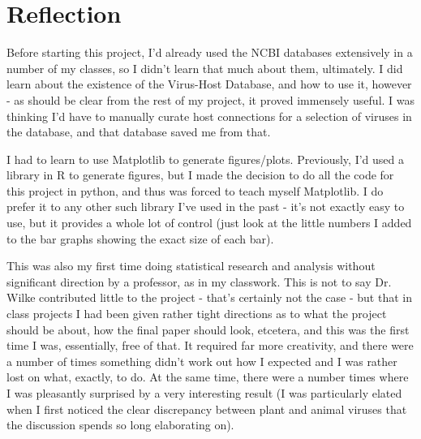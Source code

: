 \documentclass[12pt]{article}
\begin{document}
    \pagebreak

    \section{Reflection}

    Before starting this project, I'd already used the NCBI databases extensively
    in a number of my classes, so I didn't learn that much about them, ultimately.
    I did learn about the existence of the Virus-Host Database, and how to use it,
    however - as should be clear from the rest of my project, it proved immensely
    useful. I was thinking I'd have to manually curate host connections for a
    selection of viruses in the database, and that database saved me from that.

    I had to learn to use Matplotlib to generate figures/plots. Previously, I'd
    used a library in R to generate figures, but I made the decision to do all
    the code for this project in python, and thus was forced to teach myself
    Matplotlib. I do prefer it to any other such library I've used in the past -
    it's not exactly easy to use, but it provides a whole lot of control (just
    look at the little numbers I added to the bar graphs showing the exact
    size of each bar).

    This was also my first time doing statistical research and analysis without
    significant direction by a professor, as in my classwork. This is not to say
    Dr. Wilke contributed little to the project - that's certainly not the case -
    but that in class projects I had been given rather tight directions as to what
    the project should be about, how the final paper should look, etcetera, and
    this was the first time I was, essentially, free of that. It required far more
    creativity, and there were a number of times something didn't work out how I
    expected and I was rather lost on what, exactly, to do. At the same time, there
    were a number times where I was pleasantly surprised by a very interesting
    result (I was particularly elated when I first noticed the clear discrepancy
    between plant and animal viruses that the discussion spends so long elaborating
    on).
\end{document}
